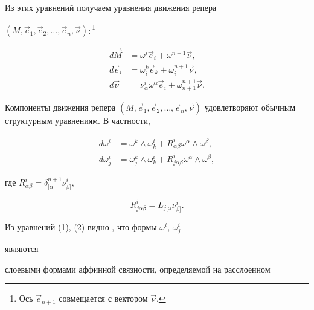 Из этих уравнений получаем уравнения движения репера 


$(M,\Vec e_1,\Vec e_2,\dotsc,\Vec e_n,\Vec \nu)$:\,\footnote{Ось $\Vec 


e_{n+1}$ совмещается с вектором $\Vec \nu$.} 


\begin{align*} 


d\Vec M&=\omega^i\Vec e_i+\omega^{n+1}\Vec \nu,\\ 


d\Vec e_i&=\omega^k_i\Vec e_k+\omega^{n+1}_i\Vec \nu,\\ 


d\Vec \nu&=\nu^i_\alpha\omega^\alpha\Vec e_i+ 


\omega^{n+1}_{n+1}\Vec \nu. 


\end{align*} 


\addtocounter{footnote}{-1} 


 


Компоненты движения репера $(M,\Vec e_1,\Vec e_2,\dotsc,\Vec e_n,\Vec 


\nu)$ удовлетворяют обычным структурным уравнениям. В частности, 


\begin{align} 


d\omega^i&=\omega^k\wedge\omega^i_k+ 


R^i_{\alpha\beta}\omega^\alpha\wedge\omega^\beta, \\ 


d\omega^i_j&=\omega^k_j\wedge\omega^i_k+ 


R^i_{j\alpha\beta}\omega^\alpha\wedge\omega^\beta, 


\end{align} 


где $R^i_{\alpha\beta}=\delta{}^{n+1}_{[\alpha}\nu{}^i_{\beta]}$,


\begin{equation} 


R^i_{j\alpha\beta}=L{}_{j[\alpha}\nu{}^i_{\beta]}. 


\end{equation} 


 


Из уравнений (1), (2) видно \cite{1}, что формы $\omega^i$, $\omega^i_j$ 


являются 


слоевыми формами аффинной связности, определяемой на расслоенном 


